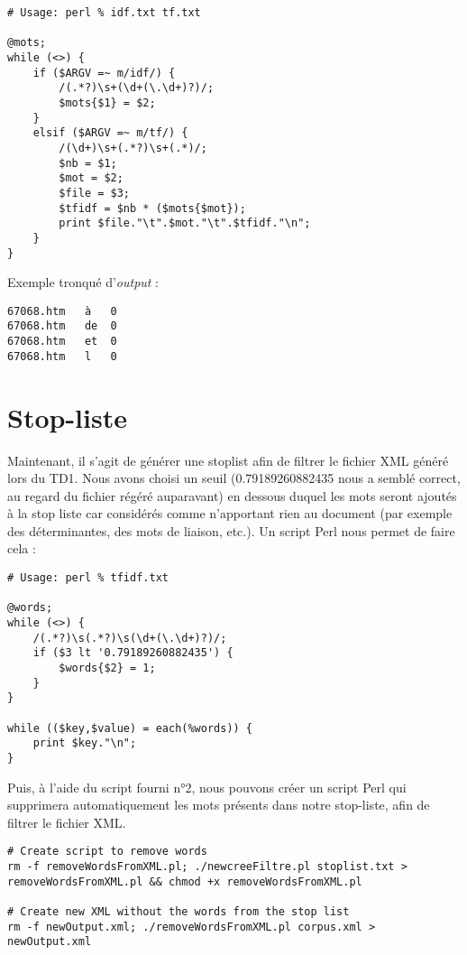 \begin{lstlisting}
# Usage: perl % idf.txt tf.txt

@mots;
while (<>) {
    if ($ARGV =~ m/idf/) {
        /(.*?)\s+(\d+(\.\d+)?)/;
        $mots{$1} = $2;
    }
    elsif ($ARGV =~ m/tf/) {
        /(\d+)\s+(.*?)\s+(.*)/;
        $nb = $1;
        $mot = $2;
        $file = $3;
        $tfidf = $nb * ($mots{$mot});
        print $file."\t".$mot."\t".$tfidf."\n";
    }
}
\end{lstlisting}
\fakeshell

\medskip

\noindent Exemple tronqué d'\textit{output} :
\begin{lstlisting}
67068.htm	à	0
67068.htm	de	0
67068.htm	et	0
67068.htm	l	0
\end{lstlisting}


\section{Stop-liste}

Maintenant, il s'agit de générer une stoplist afin de filtrer le fichier XML généré lors du TD1. Nous avons choisi un seuil (0.79189260882435 nous a semblé correct, au regard du fichier régéré auparavant) en dessous duquel les mots seront ajoutés à la stop liste car considérés comme n'apportant rien au document (par exemple des déterminantes, des mots de liaison, etc.). Un script Perl nous permet de faire cela :

\perl
\begin{lstlisting}
# Usage: perl % tfidf.txt

@words;
while (<>) {
    /(.*?)\s(.*?)\s(\d+(\.\d+)?)/;
    if ($3 lt '0.79189260882435') {
        $words{$2} = 1;
    }
}

while (($key,$value) = each(%words)) {
    print $key."\n";
}
\end{lstlisting}

Puis, à l'aide du script fourni n°2, nous pouvons créer un script Perl qui supprimera automatiquement les mots présents dans notre stop-liste, afin de filtrer le fichier XML.

\fakeshell
\begin{lstlisting}
# Create script to remove words
rm -f removeWordsFromXML.pl; ./newcreeFiltre.pl stoplist.txt > removeWordsFromXML.pl && chmod +x removeWordsFromXML.pl

# Create new XML without the words from the stop list
rm -f newOutput.xml; ./removeWordsFromXML.pl corpus.xml > newOutput.xml
\end{lstlisting}
